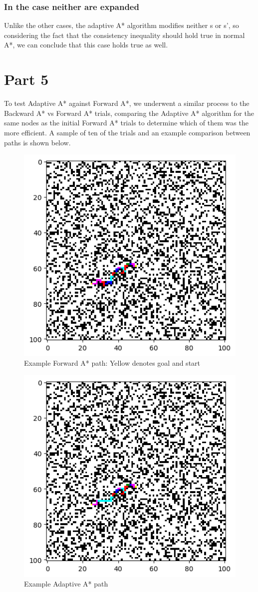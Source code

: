 \documentclass{article}
\begin{document}
\subsubsection{In the case neither are expanded}
Unlike the other cases, the adaptive A* algorithm modifies neither s or s', so considering the fact that the consistency inequality should hold true in normal A*, we can conclude that this case holds true as well.
\section{Part 5}
To test Adaptive A* against Forward A*, we underwent a similar process to the Backward A* vs Forward A* trials, comparing the Adaptive A* algorithm for the same nodes as the initial Forward A* trials to determine which of them was the more efficient. A sample of ten of the trials and an example comparison between paths is shown below.
\begin{figure}
	\caption{Example Forward A* path: Yellow denotes goal and start}
	\centering
	\includegraphics[scale=0.75]{visF2}
\end{figure}
\begin{figure}
	\caption{Example Adaptive A* path}
	\centering
	\includegraphics[scale=0.75]{visA}
\end{figure}
\end{document}
